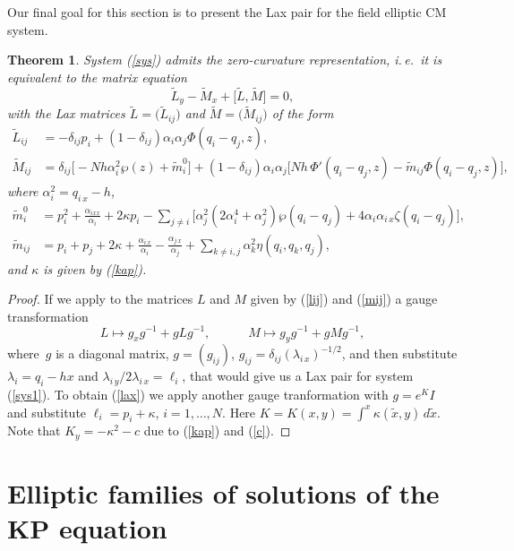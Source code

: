 \documentclass[a4paper,11pt]{article}
\newcommand{\wt}{\widetilde}
\theoremstyle{plain}
\newtheorem{teo}{Theorem}
\theoremstyle{remark}
\begin{document}
Our final goal for this section is to present the Lax pair for the
field elliptic CM system.
\begin{teo}
System \emph{(\ref{sys})} admits the zero-curvature representation,
i.\,e.~it is equivalent to the matrix equation
$$
\wt L_y-\wt M_x+\bigl[\wt L, \wt M \bigr]=0,
$$
with the Lax matrices $\wt L=\bigl(\wt L_{ij}\bigr)$ and
$\wt M=\bigl(\wt M_{ij}\bigr)$ of the form
\begin{equation}\label{lax}
\begin{aligned}
\wt L_{ij}&=-\delta_{ij}p_i+(1-\delta_{ij})\alpha_i\alpha_j\Phi(q_i-q_j,z), \\
\wt M_{ij}&=\delta_{ij} \bigl[ -Nh \alpha_i^2 \wp(z)+ \wt m_{i}^0 \bigr]+
(1-\delta_{ij}) \alpha_i\alpha_j
\bigl[ Nh\,\Phi'(q_i-q_j,z)- \wt m_{ij} \Phi(q_i-q_j,z) \bigr] ,
\end{aligned}
\end{equation}
where $\alpha_i^2=q_{i\,x}-h$,
$$
\begin{aligned}
\wt m_i^0 &=p_i^2+\frac{\alpha_{ixx}}{\alpha_i}+2\kappa p_i-
\sum_{j\neq i} \bigl[ \alpha_j^2(2\alpha_i^4+\alpha_j^2)\wp(q_i-q_j)+
4\alpha_i\alpha_{i\,x}\zeta(q_i-q_j) \bigr],\\
\wt m_{ij}&=p_i+p_j+2\kappa+\frac{\alpha_{i\,x}}{\alpha_i}-
\frac{\alpha_{j\,x}}{\alpha_j}
+\sum_{k\neq i,j}\alpha_k^2 \eta(q_i,q_k,q_j),
\end{aligned}
$$
and $\kappa$ is given by \emph{(\ref{kap})}.
\end{teo}
\begin{proof}
If we apply to the matrices $L$ and $M$ given by
(\ref{lij}) and (\ref{mij}) a gauge transformation
$$
L\longmapsto g_x g^{-1}+g L g^{-1},\qquad\quad
M\longmapsto g_y g^{-1}+g M g^{-1},
$$
where~$g$ is a diagonal matrix,
$g=(g_{ij})$, $g_{ij}=\delta_{ij}(\lambda_{i\,x})^{-1/2}$,
and then substitute
$\lambda_i=q_i-h x$ and $\lambda_{i\,y}/2\lambda_{i\,x}=\ell_i$,
that would give us a Lax pair for system (\ref{sys1}).
To obtain (\ref{lax}) we apply another gauge tranformation with
$g=e^{K} I$ and substitute $\ell_i=p_i+\kappa$, $i=1,\dots,N$.
Here $K=K(x,y)=\int^{x} \kappa(\wt x,y)\,d{\wt x}$. Note that
$K_y=-\kappa^2-c$ due to (\ref{kap}) and (\ref{c}).
\end{proof}

\section{Elliptic families of solutions of the KP equation}
\end{document}
